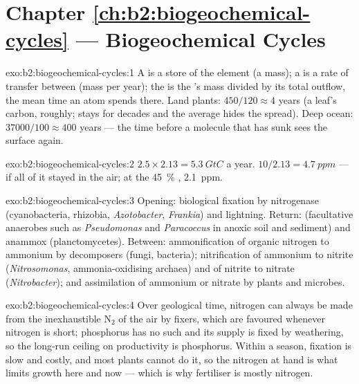 \section*{Chapter \ref{ch:b2:biogeochemical-cycles} --- Biogeochemical Cycles}

\begin{solution}{exo:b2:biogeochemical-cycles:1}
A  is a store of the element (a mass); a  is a rate of
transfer between  (mass per year); the  is
the 's mass divided by its total outflow, the mean time an
atom spends there. Land plants: $450/120 \approx 4$ years (a leaf's
carbon, roughly;  stays for decades and the average hides the
spread). Deep ocean: $37000/100 \approx 400$ years --- the time
before a molecule that has sunk sees the surface again.
\end{solution}

\begin{solution}{exo:b2:biogeochemical-cycles:2}
$2.5\times 2.13 = \qty{5.3}{GtC}$ a year. $10/2.13 = \qty{4.7}{ppm}$
--- if all of it stayed in the air; at the \qty{45}{\%} , \qty{2.1}{ppm}.
\end{solution}

\begin{solution}{exo:b2:biogeochemical-cycles:3}
Opening: biological fixation by nitrogenase (cyanobacteria,
rhizobia, \emph{Azotobacter}, \emph{Frankia}) and lightning. Return:
 (facultative anaerobes such as \emph{Pseudomonas}
and \emph{Paracoccus} in anoxic soil and sediment) and anammox
(planctomycetes). Between: ammonification of organic nitrogen to
ammonium by decomposers (fungi, bacteria); nitrification of
ammonium to nitrite (\emph{Nitrosomonas}, ammonia-oxidising
archaea) and of nitrite to nitrate (\emph{Nitrobacter}); and
assimilation of ammonium or nitrate by plants and microbes.
\end{solution}

\begin{solution}{exo:b2:biogeochemical-cycles:4}
Over geological time, nitrogen can always be made from the
inexhaustible $\mathrm{N_2}$ of the air by fixers, which are favoured
whenever nitrogen is short; phosphorus has no such  and
its supply is fixed by weathering, so the long-run ceiling on
productivity is phosphorus. Within a season, fixation is slow and
costly, and most plants cannot do it, so the nitrogen at hand is
what limits growth here and now --- which is why fertiliser is
mostly nitrogen.
\end{solution}

